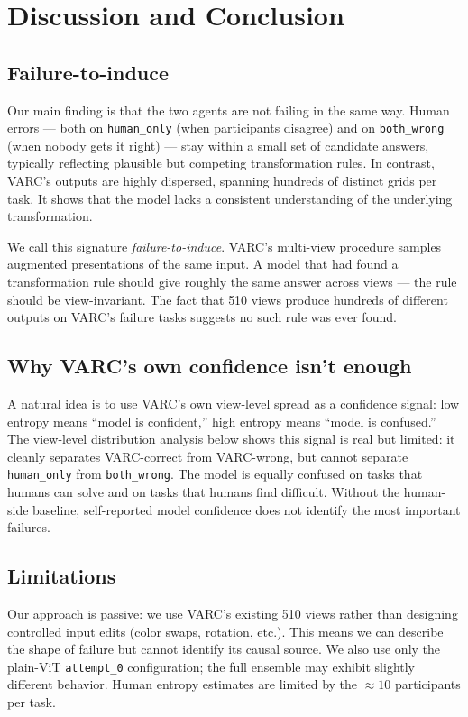 \documentclass[10pt,letterpaper]{article}
\begin{document}
\section{Discussion and Conclusion}

\subsection{Failure-to-induce}

Our main finding is that the two agents are not failing in the same way.
Human errors --- both on \texttt{human\_only} (when participants
disagree) and on \texttt{both\_wrong} (when nobody gets it right) ---
stay within a small set of candidate answers, typically reflecting
plausible but competing transformation rules. In contrast, VARC's
outputs are highly dispersed, spanning hundreds of distinct grids per
task. It shows that the model lacks a consistent understanding of the
underlying transformation.

We call this signature \emph{failure-to-induce}. VARC's multi-view
procedure samples augmented presentations of the same input. A model
that had found a transformation rule should give roughly the same answer
across views --- the rule should be view-invariant. The fact that 510
views produce hundreds of different outputs on VARC's failure tasks
suggests no such rule was ever found.

\subsection{Why VARC's own confidence isn't enough}

A natural idea is to use VARC's own view-level spread as a confidence
signal: low entropy means ``model is confident,'' high entropy means
``model is confused.'' The view-level distribution analysis below shows this
signal is real but limited: it cleanly separates VARC-correct from
VARC-wrong, but cannot separate \texttt{human\_only} from
\texttt{both\_wrong}. The model is equally confused on tasks that
humans can solve and on tasks that humans find difficult. Without the
human-side baseline, self-reported model confidence does not identify
the most important failures.

\subsection{Limitations}

Our approach is passive: we use VARC's existing 510 views rather than
designing controlled input edits (color swaps, rotation, etc.). This
means we can describe the shape of failure but cannot identify its
causal source. We also use only the plain-ViT \texttt{attempt\_0}
configuration; the full ensemble may exhibit slightly different
behavior. Human entropy estimates are limited by the $\approx 10$
participants per task.
\end{document}
